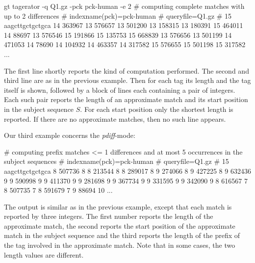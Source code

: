 \documentclass[12pt]{article}
\begin{document}
\begin{Output}
gt tagerator -q Q1.gz -pck pck-human -e 2
# computing complete matches with up to 2 differences
# indexname(pck)=pck-human
# queryfile=Q1.gz
# 15 aagcttgctgctgca
14 363967
13 576657
13 501200
13 158315
13 180391
15 464011
14 88697
13 576546
15 191866
15 135753
15 668839
13 576656
13 501199
14 471053
14 78690
14 104932
14 463357
14 317582
15 576655
15 501198
15 317582
...
\end{Output}
The first line shortly reports the kind of computation performed. The second
and third line are as in the previous example. Then for
each tag its length and the tag itself is shown, followed by 
a block of lines each containing a pair of integers. Each such pair
reports the length of an approximate match and its start position in the
subject sequence \(S\). For each
start position only the shortest length is reported. If there are no
approximate matches, then no such line appears.

Our third example concerns the \textit{pdiff}-mode:

\begin{Output}
# computing prefix matches <= 1 differences and at most 5 occurrences in the subject sequences
# indexname(pck)=pck-human
# queryfile=Q1.gz
# 15 aagcttgctgctgca
8 507736 8
8 213544 8
8 289017 8
9 274066 8
9 427225 8
9 632436 9
9 590998 9
9 411370 9
9 281698 9
9 367734 9
9 331595 9
9 342090 9
8 616567 7
8 507735 7
8 591679 7
9 88694 10
...
\end{Output}

The output is similar as in the previous example, except that each match
is reported by three integers. The first number reports the length of the
approximate match, the second reports the start position of the approximate
match in the subject sequence and the third reports the length of the prefix 
of the tag involved in the approximate match. Note that in some cases,
the two length values are different.
\end{document}
